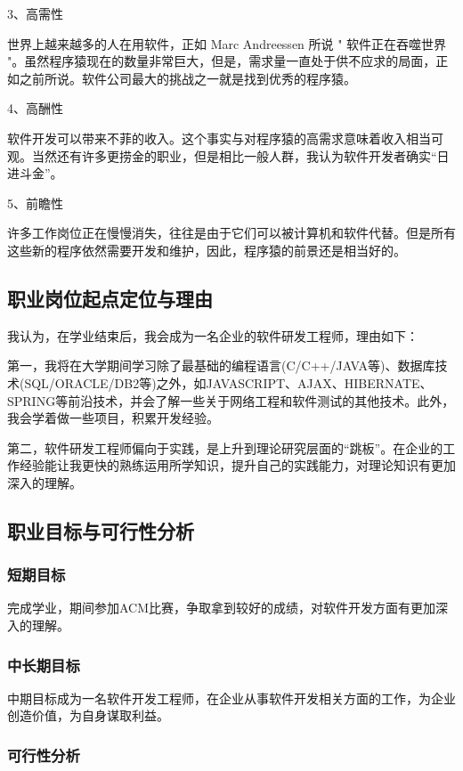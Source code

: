 \documentclass{article}
\begin{document}
3、高需性

世界上越来越多的人在用软件，正如 Marc Andreessen 所说 " 软件正在吞噬世界 "。虽然程序猿现在的数量非常巨大，但是，需求量一直处于供不应求的局面，正如之前所说。软件公司最大的挑战之一就是找到优秀的程序猿。

4、高酬性

软件开发可以带来不菲的收入。这个事实与对程序猿的高需求意味着收入相当可观。当然还有许多更捞金的职业，但是相比一般人群，我认为软件开发者确实“日进斗金”。

5、前瞻性

许多工作岗位正在慢慢消失，往往是由于它们可以被计算机和软件代替。但是所有这些新的程序依然需要开发和维护，因此，程序猿的前景还是相当好的。


\subsection{职业岗位起点定位与理由}

我认为，在学业结束后，我会成为一名企业的软件研发工程师，理由如下：

第一，我将在大学期间学习除了最基础的编程语言(C/C++/JAVA等)、数据库技术(SQL/ORACLE/DB2等)之外，如JAVASCRIPT、AJAX、HIBERNATE、SPRING等前沿技术，并会了解一些关于网络工程和软件测试的其他技术。此外，我会学着做一些项目，积累开发经验。

第二，软件研发工程师偏向于实践，是上升到理论研究层面的“跳板”。在企业的工作经验能让我更快的熟练运用所学知识，提升自己的实践能力，对理论知识有更加深入的理解。

\subsection{职业目标与可行性分析}

\subsubsection{短期目标}

完成学业，期间参加ACM比赛，争取拿到较好的成绩，对软件开发方面有更加深入的理解。

\subsubsection{中长期目标}

中期目标成为一名软件开发工程师，在企业从事软件开发相关方面的工作，为企业创造价值，为自身谋取利益。

\subsubsection{可行性分析}
\end{document}
